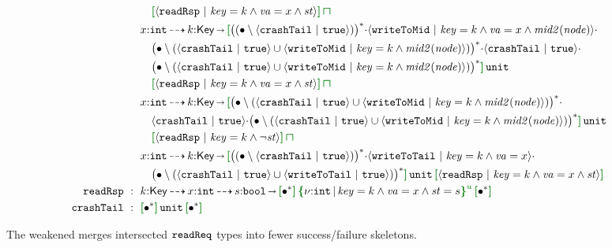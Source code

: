 {\begin{align*}
  \\ & \quad \effL{} \msg{readRsp}{\I{key}=k\land\I{va}=x\land\mathit{st}} \effR{} \interty
  \\
  & x{:}\Int \garr  k{:}\mathsf{Key} \sarr \effL{} \SNegStar{\msg{crashTail}{\true}}\seqA\msg{writeToMid}{\I{key}=k\land\I{va}=x\land\mathit{mid2}(\I{node})}\seqA
  \\ & \quad \SNegStarU{\msg{crashTail}{\true}}{\msg{writeToMid}{\I{key}=k\land\mathit{mid2}(\I{node})}}\seqA\msg{crashTail}{\true}\seqA
  \\ & \quad \SNegStarU{\msg{crashTail}{\true}}{\msg{writeToMid}{\I{key}=k\land\mathit{mid2}(\I{node})}} \effR{}\,\Code{unit}\,{}
  \\ & \quad \effL{} \msg{readRsp}{\I{key}=k\land\I{va}=x\land\mathit{st}} \effR{} \interty
  \\
  & x{:}\Int \garr  k{:}\mathsf{Key} \sarr \effL{} \SNegStarU{\msg{crashTail}{\true}}{\msg{writeToMid}{\I{key}=k\land\mathit{mid2}(\I{node})}}\seqA
  \\ & \quad \msg{crashTail}{\true}\seqA\SNegStarU{\msg{crashTail}{\true}}{\msg{writeToMid}{\I{key}=k\land\mathit{mid2}(\I{node})}} \effR{}\,\Code{unit}\,
  \\ & \quad \effL{} \msg{readRsp}{\I{key}=k\land\neg\mathit{st}} \effR{} \interty
  \\
  & x{:}\Int \garr  k{:}\mathsf{Key} \sarr \effL{} \SNegStar{\msg{crashTail}{\true}}\seqA\msg{writeToTail}{\I{key}=k\land\I{va}=x}\seqA
  \\ & \quad \SNegStarU{\msg{crashTail}{\true}}{\msg{writeToTail}{\true}} \effR{}\,\Code{unit}\,\effL{} \msg{readRsp}{\I{key}=k\land\I{va}=x\land\mathit{st}} \effR{}
  \\
  \eff{readRsp} ~:~{}
  & k{:}\mathsf{Key}\garr x{:}\Int \garr  s{:}\Bool \sarr \effL{} \allA \effR{}\,\urt{\Code{int}}{\I{key}=k\land\I{va}=x\land\mathit{st}=s}\,\effL{} \allA \effR{}
  \\
  \eff{crashTail} ~:~{}
  & \effL{} \allA \effR{}\,\Code{unit}\,\effL{} \allA \effR{}
\end{align*}}
\vspace{-.4cm}\par\nobreak\noindent

The weakened \tyName{} merges intersected \(\boldsymbol{{\tt readReq}}\) types into fewer success/failure skeletons.

\newpage
